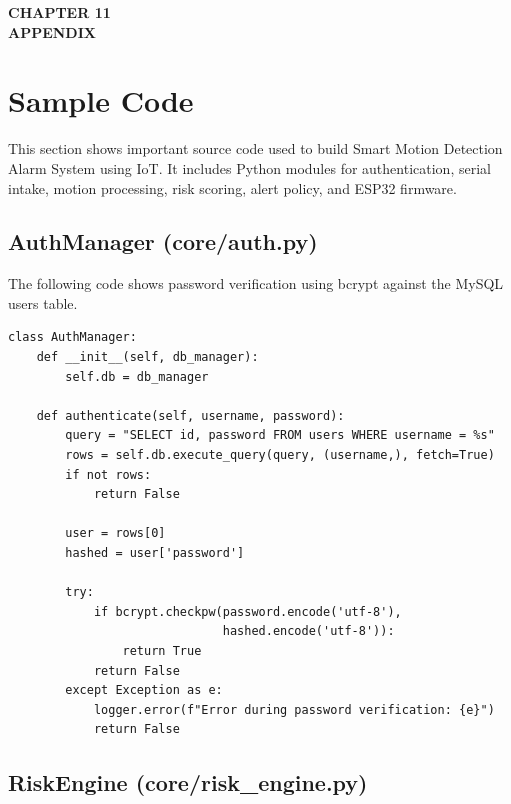 \documentclass[12pt,a4paper]{report}
\begin{document}
\cleardoublepage
\thispagestyle{empty}

\null
\vfill

\begin{center}
    {\fontsize{16pt}{18pt}\selectfont\bfseries
    CHAPTER 11}\\[0.5cm]

    {\fontsize{16pt}{18pt}\selectfont\bfseries
    APPENDIX}
\end{center}

\vfill
\null

\clearpage

\section{Sample Code}
This section shows important source code used to build Smart Motion Detection Alarm System using IoT. It includes Python modules for authentication, serial intake, motion processing, risk scoring, alert policy, and ESP32 firmware.

\subsection*{AuthManager (core/auth.py)}

The following code shows password verification using bcrypt against the MySQL users table.

\begin{verbatim}
class AuthManager:
    def __init__(self, db_manager):
        self.db = db_manager

    def authenticate(self, username, password):
        query = "SELECT id, password FROM users WHERE username = %s"
        rows = self.db.execute_query(query, (username,), fetch=True)
        if not rows:
            return False

        user = rows[0]
        hashed = user['password']

        try:
            if bcrypt.checkpw(password.encode('utf-8'),
                              hashed.encode('utf-8')):
                return True
            return False
        except Exception as e:
            logger.error(f"Error during password verification: {e}")
            return False
\end{verbatim}

\subsection*{RiskEngine (core/risk\_engine.py)}
\end{document}
